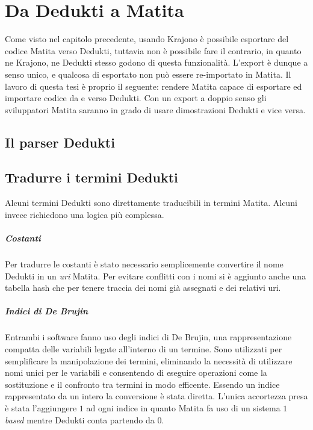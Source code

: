 \documentclass[12pt,a4paper]{report}
\begin{document}


\chapter{Da Dedukti a Matita}
Come visto nel capitolo precedente, usando Krajono è possibile esportare 
del codice Matita verso Dedukti, tuttavia non è possibile fare il contrario,
in quanto ne Krajono, ne Dedukti stesso godono di questa funzionalità.
L'export è dunque a senso unico, e qualcosa di esportato non può essere
re-importato in Matita. Il lavoro di questa tesi è proprio il seguente:
rendere Matita capace di esportare ed importare codice da e verso Dedukti.
Con un export a doppio senso gli sviluppatori Matita saranno in grado 
di usare dimostrazioni Dedukti e vice versa.

\section{Il parser Dedukti} \label{parserDedukti}

\section{Tradurre i termini Dedukti}
Alcuni termini Dedukti sono direttamente traducibili in termini Matita. Alcuni
invece richiedono una logica più complessa.

\paragraph{Costanti}
Per tradurre le costanti è stato necessario semplicemente convertire il nome
Dedukti in un \textit{uri} Matita. Per evitare conflitti con i nomi si è aggiunto
anche una tabella hash che per tenere traccia dei nomi già assegnati e dei 
relativi uri.

\paragraph{Indici di De Brujin}
Entrambi i software fanno uso degli indici di De Brujin, una rappresentazione
compatta delle variabili legate all'interno di un termine. Sono utilizzati per
semplificare la manipolazione dei termini, eliminando la necessità di utilizzare
nomi unici per le variabili e consentendo di eseguire operazioni come la 
sostituzione e il confronto tra termini in modo efficente. 
Essendo un indice rappresentato da un intero la conversione è stata diretta.
L'unica accortezza presa è stata l'aggiungere $1$ ad ogni indice in quanto
Matita fa uso di un sistema \textit{$1$ based} mentre Dedukti conta partendo
da $0$.
\end{document}
